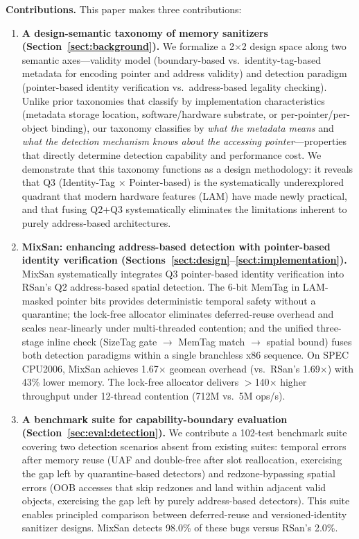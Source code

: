 \documentclass[cmc,article,submit,moreauthors,pdftex]{Definitions/tsp}
\begin{document}
\textbf{Contributions.} This paper makes three contributions:

\begin{enumerate}
\item \textbf{A design-semantic taxonomy of memory sanitizers (Section~\ref{sect:background}).} We formalize a 2$\times$2 design space along two semantic axes---validity model (boundary-based vs.\ identity-tag-based metadata for encoding pointer and address validity) and detection paradigm (pointer-based identity verification vs.\ address-based legality checking). Unlike prior taxonomies that classify by implementation characteristics (metadata storage location, software/hardware substrate, or per-pointer/per-object binding), our taxonomy classifies by \emph{what the metadata means} and \emph{what the detection mechanism knows about the accessing pointer}---properties that directly determine detection capability and performance cost. We demonstrate that this taxonomy functions as a design methodology: it reveals that Q3 (Identity-Tag $\times$ Pointer-based) is the systematically underexplored quadrant that modern hardware features (LAM) have made newly practical, and that fusing Q2+Q3 systematically eliminates the limitations inherent to purely address-based architectures.

\item \textbf{MixSan: enhancing address-based detection with pointer-based identity verification (Sections~\ref{sect:design}--\ref{sect:implementation}).} MixSan systematically integrates Q3 pointer-based identity verification into RSan's Q2 address-based spatial detection. The 6-bit MemTag in LAM-masked pointer bits provides deterministic temporal safety without a quarantine; the lock-free allocator eliminates deferred-reuse overhead and scales near-linearly under multi-threaded contention; and the unified three-stage inline check (SizeTag gate $\rightarrow$ MemTag match $\rightarrow$ spatial bound) fuses both detection paradigms within a single branchless x86 sequence. On SPEC CPU2006, MixSan achieves 1.67$\times$ geomean overhead (vs.\ RSan's 1.69$\times$) with 43\% lower memory. The lock-free allocator delivers $>$140$\times$ higher throughput under 12-thread contention (712M vs.\ 5M ops/s).

\item \textbf{A benchmark suite for capability-boundary evaluation (Section~\ref{sec:eval:detection}).} We contribute a 102-test benchmark suite covering two detection scenarios absent from existing suites: temporal errors after memory reuse (UAF and double-free after slot reallocation, exercising the gap left by quarantine-based detectors) and redzone-bypassing spatial errors (OOB accesses that skip redzones and land within adjacent valid objects, exercising the gap left by purely address-based detectors). This suite enables principled comparison between deferred-reuse and versioned-identity sanitizer designs. MixSan detects 98.0\% of these bugs versus RSan's 2.0\%.
\end{enumerate}
\end{document}
